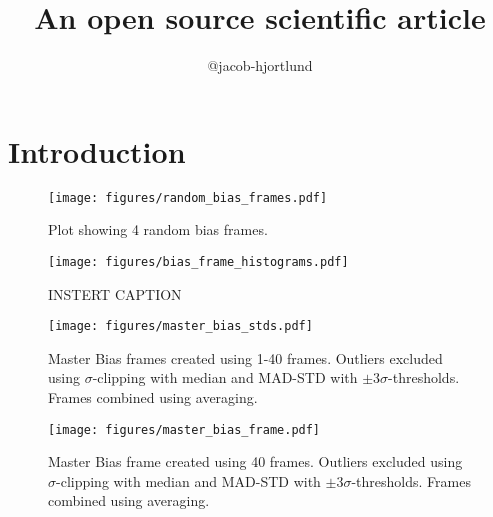 \documentclass{aastex631}
\begin{document}
\title{An open source scientific article}

\author{@jacob-hjortlund }


\begin{abstract}
    
\end{abstract}

\section{Introduction}
\label{sec:intro}


\begin{figure}[ht!]
    \begin{centering}
        \texttt{[image: figures/random\_bias\_frames.pdf]}
        \caption{
            Plot showing 4 random bias frames.
        }
        \label{fig:random_bias}
    \end{centering}
\end{figure}

\begin{figure}[ht!]
    \begin{centering}
        \texttt{[image: figures/bias\_frame\_histograms.pdf]}
        \caption{
            INSTERT CAPTION
        }
        \label{fig:bias_frame_histograms}
    \end{centering}
\end{figure}

\begin{figure}[ht!]
    \begin{centering}
        \texttt{[image: figures/master\_bias\_stds.pdf]}
        \caption{
            Master Bias frames created using 1-40 frames. Outliers excluded using $\sigma$-clipping with median and MAD-STD with $\pm3\sigma$-thresholds. Frames combined using averaging.
        }
        \label{fig:bias_frame_stats}
    \end{centering}
\end{figure}

\begin{figure}[ht!]
    \begin{centering}
        \texttt{[image: figures/master\_bias\_frame.pdf]}
        \caption{
            Master Bias frame created using 40 frames. Outliers excluded using $\sigma$-clipping with median and MAD-STD with $\pm3\sigma$-thresholds. Frames combined using averaging.
        }
        \label{fig:master_bias}
    \end{centering}
\end{figure}
\end{document}
